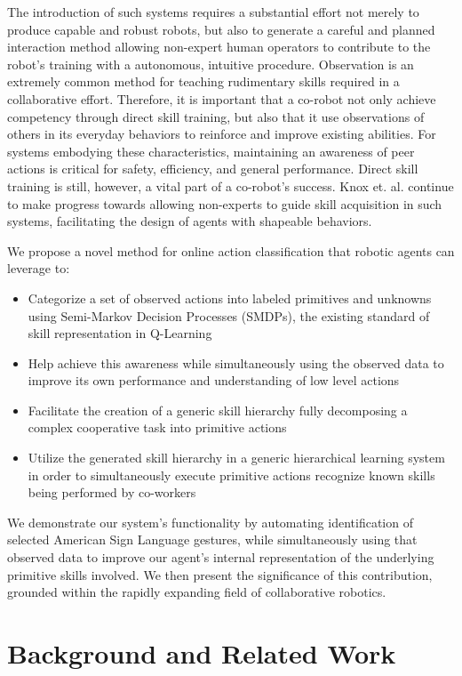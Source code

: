 \documentclass[letterpaper]{article}
\begin{document}
  The introduction of such systems requires a substantial effort not merely to produce capable and robust robots, but also to generate a careful and planned interaction method allowing non-expert human operators to contribute to the robot's training with a autonomous, intuitive procedure.  Observation is an extremely common method for teaching rudimentary skills required in a collaborative effort.  Therefore, it is important that a co-robot not only achieve competency through direct skill training, but also that it use observations of others in its everyday behaviors to reinforce and improve existing abilities.  For systems embodying these characteristics, maintaining an awareness of peer actions is critical for safety, efficiency, and general performance. Direct skill training is still, however, a vital part of a co-robot's success.  Knox et. al.  continue to make progress towards allowing non-experts to guide skill acquisition in such systems, facilitating the design of agents with shapeable behaviors.
  
  We propose a novel method for online action classification that robotic agents can leverage to:
  \begin{itemize}
    \item Categorize a set of observed actions into labeled primitives and unknowns using Semi-Markov Decision Processes (SMDPs), the existing standard of skill representation in Q-Learning
    \item Help achieve this awareness while simultaneously using the observed data to improve its own performance and understanding of low level actions
    \item Facilitate the creation of a generic skill hierarchy fully decomposing a complex cooperative 
task into primitive actions
    \item Utilize the generated skill hierarchy in a generic hierarchical learning system in order to simultaneously execute primitive actions recognize known skills being performed by co-workers
  \end{itemize}

  We demonstrate our system's functionality by automating identification of selected American Sign Language gestures, while simultaneously using that observed data to improve our agent's internal representation of the underlying primitive skills involved. We then present the significance of this contribution, grounded within the rapidly expanding field of collaborative robotics.

\section{Background and Related Work}
\label{sec:background}
\end{document}
